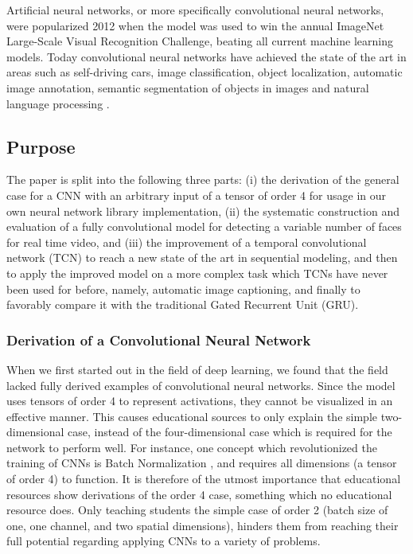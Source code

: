 \documentclass[a4paper, twoside]{article}
\begin{document}
Artificial neural networks, or more specifically convolutional neural networks, were popularized 2012 when the model was used to win the annual ImageNet Large-Scale Visual Recognition Challenge, beating all current machine learning models. Today convolutional neural networks have achieved the state of the art in areas such as self-driving cars, image classification, object localization, automatic image annotation, semantic segmentation of objects in images and natural language processing \cite{cs231n}.

\subsection{Purpose}
The paper is split into the following three parts: (i) the derivation of the general case for a CNN with an arbitrary input of a tensor of order 4 for usage in our own neural network library implementation, (ii) the systematic construction and evaluation of a fully convolutional model for detecting a variable number of faces for real time video, and (iii) the improvement of a temporal convolutional network (TCN) to reach a new state of the art in sequential modeling, and then to apply the improved model on a more complex task which TCNs have never been used for before, namely, automatic image captioning, and finally to favorably compare it with the traditional Gated Recurrent Unit (GRU).

\subsubsection{Derivation of a Convolutional Neural Network}
When we first started out in the field of deep learning, we found that the field lacked fully derived examples of convolutional neural networks. Since the model uses tensors of order 4 to represent activations, they cannot be visualized in an effective manner. This causes educational sources to only explain the simple two-dimensional case, instead of the four-dimensional case which is required for the network to perform well. For instance, one concept which revolutionized the training of CNNs is Batch Normalization \cite{cs231n}\cite{batchnorm}, and requires all dimensions (a tensor of order 4) to function. It is therefore of the utmost importance that educational resources show derivations of the order 4 case, something which no educational resource does. Only teaching students the simple case of order 2 (batch size of one, one channel, and two spatial dimensions), hinders them from reaching their full potential regarding applying CNNs to a variety of problems.
\end{document}
